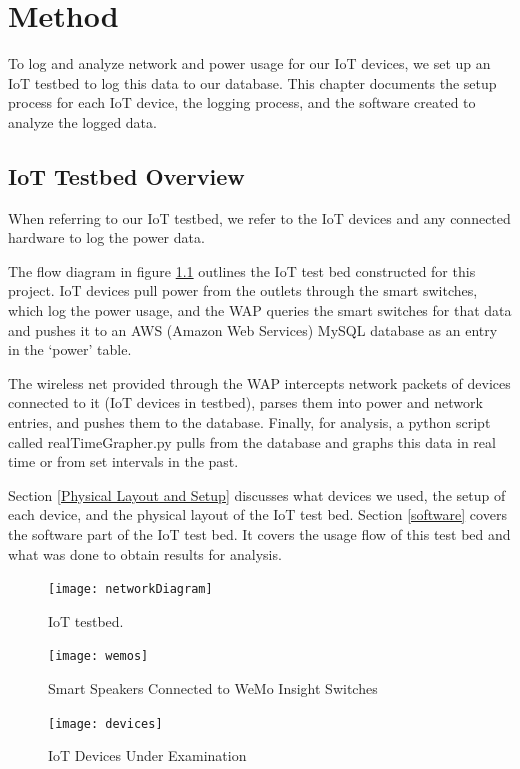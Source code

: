 \chapter{Method}
\label{Method}
To log and analyze network and power usage for our IoT devices, we set up an IoT testbed to log this data to our database. This chapter documents the setup process for each IoT device, the logging process, and the software created to analyze the logged data.

\section{IoT Testbed Overview}
When referring to our IoT testbed, we refer to the IoT devices and any connected hardware to log the power data.

The flow diagram in figure \ref{fig:network} outlines the IoT test bed constructed for this project. IoT devices pull power from the outlets through the smart switches, which log the power usage, and the WAP queries the smart switches for that data and pushes it to an AWS (Amazon Web Services)\cite{rds} MySQL\cite{mysql} database as an entry in the `power' table.

The wireless net provided through the WAP intercepts network packets of devices connected to it (IoT devices in testbed), parses them into power and network entries, and pushes them to the database. Finally, for analysis, a python script called realTimeGrapher.py pulls from the database and graphs this data in real time or from set intervals in the past.

Section \ref{Physical Layout and Setup} discusses what devices we used, the setup of each device, and the physical layout of the IoT test bed. Section \ref{software} covers the software part of the IoT test bed. It covers the usage flow of this test bed and what was done to obtain results for analysis.

\begin{figure}[H]
    \centering
    \texttt{[image: networkDiagram]}
    \caption{IoT testbed.}
    \label{fig:network}
\end{figure}

\begin{figure}[H]
    \centering
    \texttt{[image: wemos]}
    \caption{Smart Speakers Connected to WeMo Insight Switches}
    \label{fig:wemo}
\end{figure}

\begin{figure}[H]
    \centering
    \texttt{[image: devices]}
    \caption{IoT Devices Under Examination}
    \label{fig:devices}
\end{figure}

